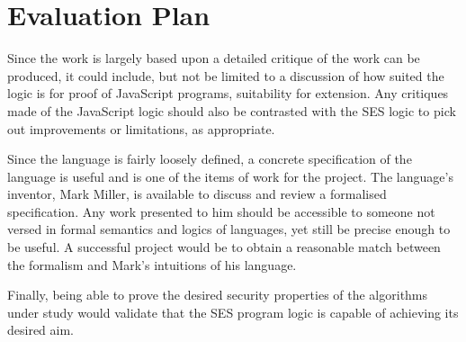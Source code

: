 \documentclass[a4paper]{report}
\begin{document}
\chapter{Evaluation Plan}
  Since the work is largely based upon \cite{gms-popl} a detailed critique of
  the work can be produced, it could include, but not be limited to a
  discussion of how suited the logic is for proof of JavaScript programs,
  suitability for extension. Any critiques made of the JavaScript logic should
  also be contrasted with the SES logic to pick out improvements or limitations,
  as appropriate.

  Since the language is fairly loosely defined, a concrete specification of the
  language is useful and is one of the items of work for the project. The
  language's inventor, Mark Miller, is available to discuss and review a
  formalised specification. Any work presented to him should be accessible to
  someone not versed in formal semantics and logics of languages, yet still be
  precise enough to be useful. A successful project would be to obtain a
  reasonable match between the formalism and Mark's intuitions of his language.

  Finally, being able to prove the desired security properties of the algorithms
  under study would validate that the SES program logic is capable of achieving
  its desired aim.



\end{document}
